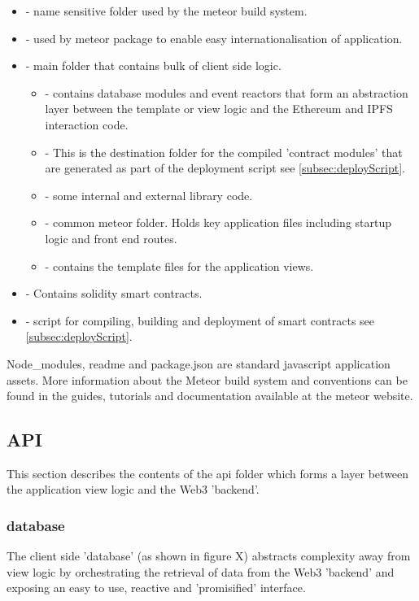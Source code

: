 \begin{itemize}
\item {} - name sensitive folder used by the meteor build system.
\item {} - used by meteor package to enable easy internationalisation of application.
\item {} - main folder that contains bulk of client side logic. 
\begin{itemize}
\item {} - contains database modules and event reactors that form an abstraction layer between the template or view logic and the Ethereum and IPFS interaction code.
\item {} - This is the destination folder for the compiled 'contract modules' that are generated as part of the deployment script see \ref{subsec:deployScript}.
\item {} - some internal and external library code.
\item {} - common meteor folder. Holds key application files including startup logic and front end routes.
\item {} - contains the template files for the application views.  
\end{itemize}
\item {} - Contains solidity smart contracts.
\item {} - script for compiling, building and deployment of smart contracts see \ref{subsec:deployScript}.
\end{itemize}

Node\_modules, readme and package.json are standard javascript application assets. More information about the Meteor build system and conventions can be found in the guides, tutorials and documentation available at the meteor website.\\

\subsection{API}
This section describes the contents of the api folder which forms a layer between the application view logic and the Web3 'backend'.

\subsubsection{database}
The client side 'database' (as shown in figure X) abstracts complexity away from view logic by orchestrating the retrieval of data from the Web3 'backend' and exposing an easy to use, reactive and 'promisified' interface.\\

